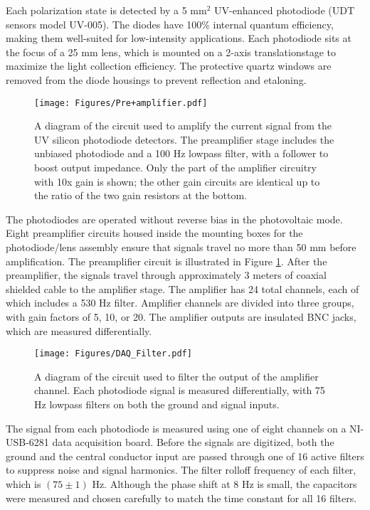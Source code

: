 \documentclass [10pt, twoside] {uwthesis}[2012/04/02]
\begin{document}
Each polarization state is detected by a 5 mm$^2$ UV-enhanced photodiode (UDT sensors model UV-005). The diodes have 100\% internal quantum efficiency, making them well-suited for low-intensity applications. Each photodiode sits at the focus of a 25 mm lens, which is mounted on a 2-axis translationstage to maximize the light collection efficiency. The protective quartz windows are removed from the diode housings to prevent reflection and etaloning. 
\begin{figure}
\begin{center}
\texttt{[image: Figures/Pre+amplifier.pdf]}
\end{center}
\caption[Photodiode amplifier circuit]{\narrower A diagram of the circuit used to amplify the current signal from the UV silicon photodiode detectors. The preamplifier stage includes the unbiased photodiode and a 100 Hz lowpass filter, with a follower to boost output impedance. Only the part of the amplifier circuitry with 10x gain is shown; the other gain circuits are identical up to the ratio of the two gain resistors at the bottom.}
\label{Amplifier_Diagram}
\end{figure}

The photodiodes are operated without reverse bias in the photovoltaic mode. Eight preamplifier circuits housed inside the mounting boxes for the photodiode/lens assembly ensure that signals travel no more than 50 mm before amplification. The preamplifier circuit is illustrated in Figure \ref{Amplifier_Diagram}. After the preamplifier, the signals travel through approximately 3 meters of coaxial shielded cable to the amplifier stage. The amplifier has 24 total channels, each of which includes a 530 Hz filter. Amplifier channels are divided into three groups, with gain factors of 5, 10, or 20. The amplifier outputs are insulated BNC jacks, which are measured differentially.
\begin{figure}
\begin{center}
\texttt{[image: Figures/DAQ\_Filter.pdf]}
\end{center}
\caption[Analog filter circuit]{\narrower A diagram of the circuit used to 
filter the output of the amplifier channel. Each photodiode signal is measured 
differentially, with 75 Hz lowpass filters on both the ground and signal 
inputs.}
\label{DAQ_Filter}
\end{figure}

The signal from each photodiode is measured using one of eight channels on a NI-USB-6281 data acquisition board. Before the signals are digitized, both the ground and the central conductor input are passed through one of 16 active filters to suppress noise and signal harmonics. The filter rolloff frequency of each filter, which is $(75 \pm 1)$ Hz. Although the phase shift at 8 Hz is small, the capacitors were measured and chosen carefully to match the time constant for all 16 filters. 
\end{document}
